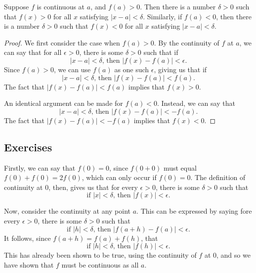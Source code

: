 \begin{theorem} \label{contposneg}
Suppose $f$ is continuous at $a$, and $f(a) > 0$. Then there is a number $\delta > 0$ such that $f(x) > 0$ for all $x$ satisfying $|x - a| < \delta$. Similarly, if $f(a) < 0$, then there is a number $\delta > 0$ such that $f(x) < 0$ for all $x$ satisfying $|x - a| < \delta$.

\begin{proof}
We first consider the case when $f(a) > 0$. By the continuity of $f$ at $a$, we can say that for all $\epsilon > 0$, there is some $\delta > 0$ such that if
\[ |x - a| < \delta \textrm{, then } |f(x) - f(a)| < \epsilon. \]
Since $f(a) > 0$, we can use $f(a)$ as one such $\epsilon$, giving us that if
\[ |x - a| < \delta \textrm{, then } |f(x) - f(a)| < f(a). \]
The fact that $|f(x) - f(a)| < f(a)$ implies that $f(x) > 0$.

An identical argument can be made for $f(a) < 0$. Instead, we can say that
\[ |x - a| < \delta \textrm{, then } |f(x) - f(a)| < -f(a). \]
The fact that $|f(x) - f(a)| < -f(a)$ implies that $f(x) < 0$.
\end{proof}
\end{theorem}

\subsection{Exercises}
\begin{problem}[6-7]
Firstly, we can say that $f(0) = 0$, since $f(0 + 0)$ must equal $f(0) + f(0) = 2f(0)$, which can only occur if $f(0) = 0$. The definition of continuity at 0, then, gives us that for every $\epsilon > 0$, there is some $\delta > 0$ such that
\[ \textrm{if } |x| < \delta \textrm{, then } |f(x)| < \epsilon. \]

Now, consider the continuity at any point $a$. This can be expressed by saying fore every $\epsilon > 0$, there is some $\delta > 0$ such that
\[ \textrm{if } |h| < \delta \textrm{, then } |f(a + h) - f(a)| < \epsilon. \]
It follows, since $f(a + h) = f(a) + f(h)$, that
\[ \textrm{if } |h| < \delta \textrm{, then } |f(h)| < \epsilon. \]
This has already been shown to be true, using the continuity of $f$ at 0, and so we have shown that $f$ must be continuous as all $a$.
\end{problem}

